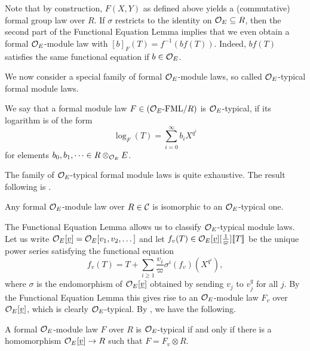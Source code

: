 \documentclass[../main.tex]{subfiles}
\begin{document}
Note that by construction, $F(X,Y)$ as defined above yields a (commutative)
formal group law over $R$. 
If $\sigma$ restricts to the identity on $\mathcal{O}_E \subseteq R$, then 
the second part of the Functional Equation Lemma implies that we even obtain
a formal $\mathcal{O}_E$-module law with $[b]_F(T) = f^{-1}(b f(T))$. Indeed, $bf(T)$
satisfies the same functional equation if $b \in \mathcal{O}_E$. 

We now consider a special family of 
formal $\mathcal{O}_E$-module laws, so called $\mathcal{O}_E$-typical formal module laws.

\begin{defi}\label{def:ATypicFormalModuleLaw}
  We say that a formal module law $F \in {({\mathcal{O}_E}\textnormal-\allowbreak\mathrm{FML}/{R})}$ is 
  $\mathcal{O}_E$-typical, if its logarithm is of the form
  \begin{equation*}
    \log_F(T) = \sum_{i=0}^\infty b_i X^{q^i}
  \end{equation*}
  for elements $b_0, b_1, \dots \in R \otimes_{\mathcal{O}_E} E$.
\end{defi}

The family of $\mathcal{O}_E$-typical formal module laws is quite exhaustive.
The result following is \cite[21.5.6]{hazewinkel1978formal}.

\begin{lem}\label{lem:AnyOModuleIsIsomorphicToAtypic}
  Any formal $\mathcal{O}_E$-module law over $R \in \mathcal{C}$ is isomorphic to an
  $\mathcal{O}_E$-typical one.
\end{lem}

The Functional Equation Lemma allows us to classify $\mathcal{O}_E$-typical module
laws. Let us write $\mathcal{O}_E[\underline v] = \mathcal{O}_E[v_1, v_2, \dots]$ and let
$f_v(T) \in \mathcal{O}_E[\underline v][\tfrac 1\varpi]\llbracket T \rrbracket$ be the unique power series
satisfying the functional equation
\begin{equation*}
  f_v(T) = T + \sum_{i \geq 1} \frac{v_i}{\varpi} \sigma^i(f_v)(X^{q^i}),
\end{equation*}
where $\sigma$ is the endomorphism of $\mathcal{O}_E[\underline v]$ obtained by
sending $v_j$ to $v_j^q$ for all $j$. By the Functional Equation Lemma
this gives rise to an $\mathcal{O}_E$-module law $F_v$ over $\mathcal{O}_E[\underline v]$,
which is clearly $\mathcal{O}_E$-typical.
By \cite[Definition 21.5.5 and Criterion 21.5.9]{hazewinkel1978formal},
we have the following.

\begin{lem}\label{lem:ClassificationOfAtypicalOnes}
  A formal $\mathcal{O}_E$-module law $F$ over $R$ is $\mathcal{O}_E$-typical if and only if there is
  a homomorphism $\mathcal{O}_E[\underline v] \to R$ such that $F = F_v \otimes R$. 
\end{lem}
\end{document}
